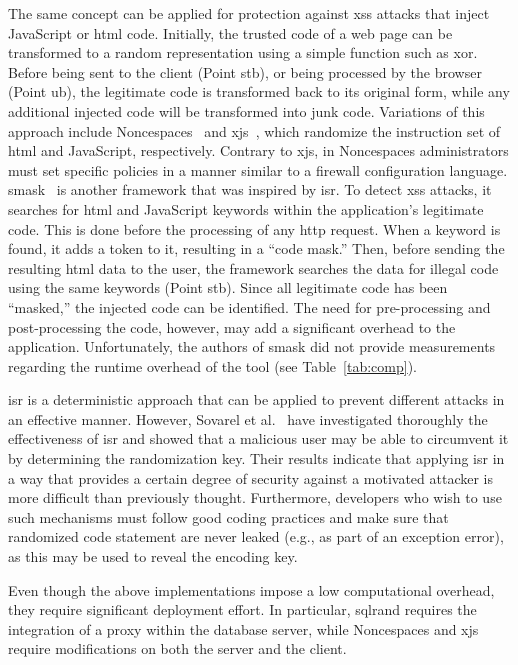 \documentclass[conference]{IEEEtran}
\begin{document}
The same concept can be applied for protection against
{\sc xss} attacks that inject JavaScript or {\sc html} code.
Initially, the trusted code of a web page can be transformed
to a random representation using a simple function such as {\sc xor}.
Before being sent to the client (Point {\sc s}t{\sc b}),
or being processed by the browser (Point {\sc ub}),
the legitimate code is transformed back to its original form,
while any additional injected code will be transformed into junk code.
Variations of this approach include
Noncespaces~\cite{GC09} and x{\sc js}~\cite{APKLM10}, which
randomize the instruction set of {\sc html} and JavaScript,
respectively. Contrary to x{\sc js}, in Noncespaces administrators
must set specific policies in a manner similar to a firewall
configuration language. {\sc sm}ask~\cite{JB07} is another
framework that was inspired by {\sc isr}. To detect {\sc xss}
attacks, it searches for {\sc html} and
JavaScript keywords within the application's legitimate code. This is
done before the processing of any {\sc http} request. When a keyword is found,
it adds a token to it, resulting in a ``code mask.'' Then, before
sending the resulting {\sc html} data to the user, the framework
searches the data for illegal code using the same keywords (Point
{\sc s}t{\sc b}). Since all legitimate code has been ``masked,'' the injected
code can be identified. The need for 
pre-processing and post-processing the code,
however, may add a significant overhead to the application.
Unfortunately, the authors of {\sc sm}ask did not provide measurements
regarding the runtime overhead of the tool (see
Table~\ref{tab:comp}).

{\sc isr} is a deterministic approach that can be applied to prevent
different attacks in an effective manner. However, Sovarel et
al.~\cite{SEP05} have investigated thoroughly the effectiveness of
{\sc isr} and showed that a malicious user may be able to circumvent
it by determining the randomization key. Their results indicate
that applying {\sc isr} in a way that provides a certain degree of
security against a motivated attacker is more difficult than
previously thought. Furthermore, developers who wish to use such
mechanisms must follow good coding practices and make sure that
randomized code statement are never leaked
(e.g., as part of an exception error),
as this may be used to reveal the encoding key.

Even though the above implementations impose a low computational
overhead, they require significant deployment effort. In particular,
{\sc sql}rand requires the integration of a proxy within the database
server, while Noncespaces and x{\sc js} require modifications on both
the server and the client.
\end{document}
